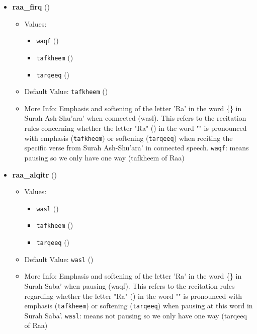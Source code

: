 \begin{itemize}
\item \textbf{raa\_firq} ()
  \begin{itemize}
  \item Values: 
    \begin{itemize}
    \item  \texttt{waqf} ()
    \item  \texttt{tafkheem} ()
    \item  \texttt{tarqeeq} ()
    \end{itemize}
  \item Default Value: \texttt{tafkheem} ()
  \item More Info: Emphasis and softening of the letter 'Ra' in the word \{\} in Surah Ash-Shu'ara' when connected (wasl). This refers to the recitation rules concerning whether the letter "Ra" () in the word "" is pronounced with emphasis (\texttt{tafkheem}) or softening (\texttt{tarqeeq}) when reciting the specific verse from Surah Ash-Shu'ara' in connected speech. \texttt{waqf}: means pausing so we only have one way (tafkheem of Raa)
  \end{itemize}

\item \textbf{raa\_alqitr} ()
  \begin{itemize}
  \item Values: 
    \begin{itemize}
    \item  \texttt{wasl} ()
    \item  \texttt{tafkheem} ()
    \item  \texttt{tarqeeq} ()
    \end{itemize}
  \item Default Value: \texttt{wasl} ()
  \item More Info: Emphasis and softening of the letter 'Ra' in the word \{\} in Surah Saba' when pausing (waqf). This refers to the recitation rules regarding whether the letter "Ra" () in the word "" is pronounced with emphasis (\texttt{tafkheem}) or softening (\texttt{tarqeeq}) when pausing at this word in Surah Saba'. \texttt{wasl}: means not pausing so we only have one way (tarqeeq of Raa)
  \end{itemize}


\end{itemize}
